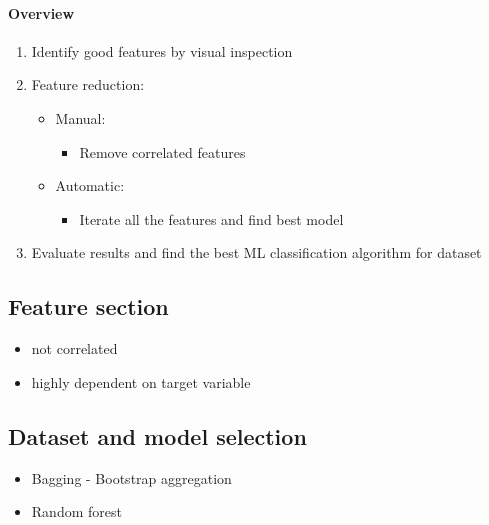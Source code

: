 \paragraph{Overview} 
\begin{enumerate}
    \item Identify good features by visual inspection 
    \item Feature reduction:
        \begin{itemize}
            \item Manual:
                \begin{itemize}
                    \item Remove correlated features
                \end{itemize}
                
            \item Automatic:
                \begin{itemize}
                    \item Iterate all the features and find best model 
                \end{itemize}
                
        \end{itemize}
        
    \item Evaluate results and find the best ML classification algorithm for dataset 
    
\end{enumerate}


\subsection{Feature section}
\begin{itemize}
    \item not correlated
    \item highly dependent on target variable 
\end{itemize}




\subsection{Dataset and model selection}
\begin{itemize}
    \item Bagging - Bootstrap aggregation
    \item Random forest
\end{itemize}

